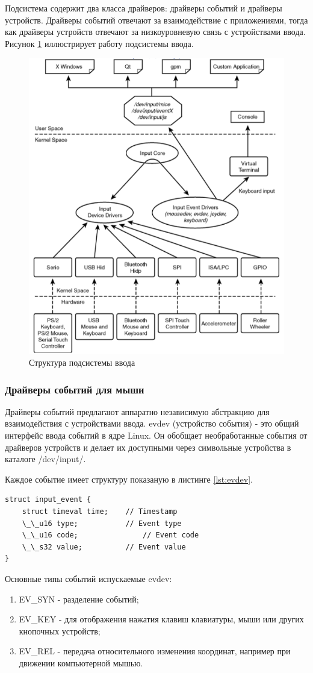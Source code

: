 Подсистема содержит два класса драйверов: драйверы событий и драйверы устройств. 
Драйверы событий отвечают за взаимодействие с приложениями, тогда как драйверы устройств отвечают за низкоуровневую связь с устройствами ввода. 
Рисунок \ref*{fig:inputsystem} иллюстрирует работу подсистемы ввода.

\begin{figure}[H]
	\centering
	\includegraphics[width=0.7\linewidth]{src/img/input_system}
	\caption{Структура подсистемы ввода}
	\label{fig:inputsystem}
\end{figure}

\subsubsection{Драйверы событий для мыши}
Драйверы событий предлагают аппаратно независимую абстракцию для взаимодействия с устройствами ввода.
evdev (устройство события) - это общий интерфейс ввода событий в ядре Linux. 
Он обобщает необработанные события от драйверов устройств и делает их доступными через символьные устройства в каталоге /dev/input/. 

Каждое событие имеет структуру показаную в листинге \ref{lst:evdev}.

\begin{lstlisting}[caption=Структура события evdev, label=lst:evdev]
struct input_event {
	struct timeval time; 	// Timestamp
	\_\_u16 type; 			// Event type
	\_\_u16 code;				// Event code
	\_\_s32 value;			// Event value
}
\end{lstlisting}

Основные типы событий испускаемые evdev:
\begin{enumerate}
	\item EV\_SYN - разделение событий;
	\item EV\_KEY - для отображения нажатия клавиш клавиатуры, мыши или других кнопочных устройств;
	\item EV\_REL - передача относительного изменения координат, например при движении компьютерной мышью.
\end{enumerate}




